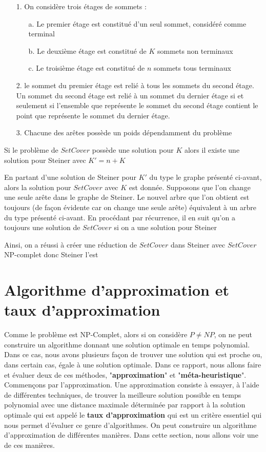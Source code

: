 \documentclass[11pt,french]{report}
\begin{document}
        \begin{itemize}
	\item[1.] On considère trois étages de sommets :
          \begin{itemize}
          \item[a.] Le premier étage est constitué d'un seul sommet, considéré comme terminal
          \item[b.] Le deuxième étage est constitué de $K$ sommets non terminaux
          \item[c.] Le troisième étage est constitué de $n$ sommets tous terminaux
          \end{itemize}
        \item[2.] le sommet du premier étage est relié à tous les sommets du second étage. Un sommet du second étage est relié à un sommet du dernier étage si et seulement si l'ensemble que représente le sommet du second étage contient le point que représente le sommet du dernier étage.
          \item[3.] Chacune des arêtes possède un poids dépendamment du problème
	\end{itemize}

        Si le problème de $Set Cover$ possède une solution pour $K$ alors il existe une solution pour Steiner avec $K' = n+K$

        En partant d'une solution de Steiner pour $K'$ du type le graphe présenté ci-avant, alors la solution pour $Set Cover$ avec $K$ est donnée.
        Supposons que l'on change une seule arête dans le graphe de Steiner. Le nouvel arbre que l'on obtient est toujours (de façon évidente car on change une seule arête) équivalent à un arbre du type présenté ci-avant. En procédant par récurrence, il en suit qu'on a toujours une solution de $Set Cover$ si on a une solution pour Steiner


        Ainsi, on a réussi à créer une réduction de $Set Cover$ dans Steiner avec $Set Cover$ NP-complet donc Steiner l'est
        
	\section{Algorithme d'approximation et taux d'approximation\label{Approx}}
	Comme le problème est NP-Complet, alors si on considère $P\neq NP$, on ne peut construire un algorithme donnant une solution optimale en temps polynomial. Dans ce cas, nous avons plusieurs façon de trouver une solution qui est proche ou, dans certain cas, égale à une solution optimale. Dans ce rapport, nous allons faire et évaluer deux de ces méthodes, "\textbf{approximation}" et "\textbf{méta-heuristique}". Commençons par l'approximation. Une approximation consiste à essayer, à l'aide de différentes techniques, de trouver la meilleure solution possible en temps polynomial avec une distance maximale déterminée par rapport à la solution optimale qui est appelé le \textbf{taux d'approximation} qui est un critère essentiel qui nous permet d'évaluer ce genre d'algorithmes. On peut construire un algorithme d'approximation de différentes manières. Dans cette section, nous allons voir une de ces manières.
	
\end{document}
